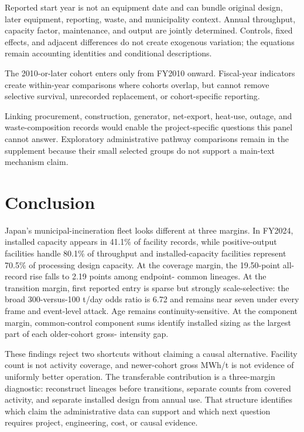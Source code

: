 \documentclass[11pt,letterpaper]{article}
\begin{document}
Reported start year is not an equipment date and can bundle original design,
later equipment, reporting, waste, and municipality context. Annual throughput,
capacity factor, maintenance, and output are jointly determined. Controls,
fixed effects, and adjacent differences do not create exogenous variation; the
equations remain accounting identities and conditional descriptions.

The 2010-or-later cohort enters only from FY2010 onward. Fiscal-year indicators
create within-year comparisons where cohorts overlap, but cannot remove
selective survival, unrecorded replacement, or cohort-specific reporting.

Linking procurement, construction, generator, net-export, heat-use, outage, and
waste-composition records would enable the project-specific questions this
panel cannot answer. Exploratory administrative pathway comparisons remain in
the supplement because their small selected groups do not support a main-text
mechanism claim.

\section{Conclusion}

Japan's municipal-incineration fleet looks different at three margins. In
FY2024, installed capacity appears in 41.1\% of facility records, while
positive-output facilities handle 80.1\% of throughput and installed-capacity
facilities represent 70.5\% of processing design capacity. At the coverage
margin, the 19.50-point all-record rise falls to 2.19 points among endpoint-
common lineages. At the transition margin, first reported entry is sparse but
strongly scale-selective: the broad 300-versus-100 t/day odds ratio is 6.72 and
remains near seven under every frame and event-level attack. Age remains
continuity-sensitive. At the component margin, common-control component sums
identify installed sizing as the largest part of each older-cohort gross-
intensity gap.

These findings reject two shortcuts without claiming a causal alternative.
Facility count is not activity coverage, and newer-cohort gross MWh/t is not
evidence of uniformly better operation. The transferable contribution is a
three-margin diagnostic: reconstruct lineages before transitions, separate
counts from covered activity, and separate installed design from annual use.
That structure identifies which claim the administrative data can support and
which next question requires project, engineering, cost, or causal evidence.
\end{document}
